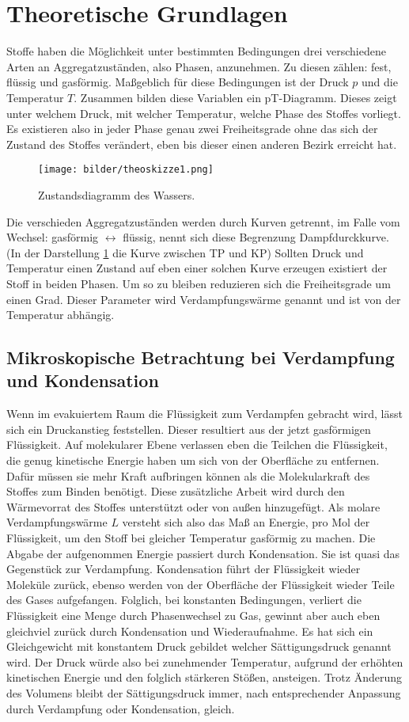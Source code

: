\section{Theoretische Grundlagen}
Stoffe haben die Möglichkeit unter bestimmten Bedingungen drei verschiedene Arten an Aggregatzuständen, also Phasen, anzunehmen.
Zu diesen zählen: fest, flüssig und gasförmig.
Maßgeblich für diese Bedingungen ist der Druck $p$ und die Temperatur $T$.  Zusammen bilden diese Variablen
ein pT-Diagramm. Dieses zeigt unter welchem Druck, mit welcher Temperatur,  welche Phase des Stoffes vorliegt.
Es existieren also in jeder Phase genau zwei Freiheitsgrade ohne das sich der Zustand des Stoffes verändert, eben bis dieser einen anderen Bezirk erreicht hat.
\begin{figure}
    \centering
    \texttt{[image: bilder/theoskizze1.png]}
    \caption{Zustandsdiagramm des Wassers. \cite{skript}} 
    \label{fig:figtheo1}
\end{figure}
Die verschieden Aggregatzuständen werden durch Kurven getrennt, im Falle vom Wechsel: gasförmig $\longleftrightarrow$ flüssig,
nennt sich diese Begrenzung Dampfdurckkurve. (In der Darstellung \ref{fig:figtheo1}
die Kurve zwischen TP und KP)
Sollten Druck und Temperatur einen Zustand auf eben einer solchen Kurve erzeugen existiert der Stoff in beiden Phasen.
Um so zu bleiben reduzieren sich die Freiheitsgrade um einen Grad. Dieser Parameter wird Verdampfungswärme genannt und ist von der Temperatur
abhängig. 

\subsection{Mikroskopische Betrachtung bei Verdampfung und Kondensation}
Wenn im evakuiertem Raum die Flüssigkeit zum Verdampfen gebracht wird, lässt sich ein Druckanstieg feststellen.
Dieser resultiert aus der jetzt gasförmigen Flüssigkeit. Auf molekularer Ebene verlassen eben die Teilchen die Flüssigkeit, die genug kinetische Energie haben um sich von der Oberfläche zu entfernen. Dafür müssen sie mehr Kraft aufbringen können als die Molekularkraft des Stoffes zum Binden benötigt.
Diese zusätzliche Arbeit wird durch den Wärmevorrat des Stoffes unterstützt oder von außen hinzugefügt.
Als molare Verdampfungswärme $L$ versteht sich also das Maß an Energie, pro Mol der Flüssigkeit, um den Stoff bei gleicher Temperatur gasförmig zu machen.
Die Abgabe der aufgenommen Energie passiert durch Kondensation. Sie ist quasi das Gegenstück zur Verdampfung.
Kondensation führt der Flüssigkeit wieder Moleküle zurück, ebenso werden von der Oberfläche der Flüssigkeit wieder Teile des Gases aufgefangen.
Folglich, bei konstanten Bedingungen, verliert die Flüssigkeit eine Menge durch Phasenwechsel zu Gas, gewinnt aber auch eben gleichviel 
zurück durch Kondensation und Wiederaufnahme. Es hat sich ein Gleichgewicht mit konstantem Druck gebildet welcher Sättigungsdruck genannt wird.
Der Druck würde also bei zunehmender Temperatur, aufgrund der erhöhten kinetischen Energie und den folglich stärkeren Stößen, ansteigen.
Trotz Änderung des Volumens bleibt der Sättigungsdruck immer, nach entsprechender Anpassung durch Verdampfung oder Kondensation, gleich.

